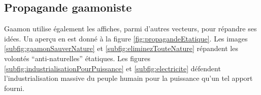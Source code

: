 \subsection{Propagande gaamoniste}
Gaamon utilise également les affiches, parmi d'autres vecteurs, pour répandre ses idées. Un aperçu en est donné à la figure \ref{fig:propagandeEtatique}. Les images \ref{subfig:gaamonSauverNature} et \ref{subfig:eliminezTouteNature} répandent les volontés \enquote{anti-naturelles} étatiques. Les figures \ref{subfig:industrialisationPourPuissance} et \ref{subfig:electricite} défendent l'industrialisation massive du peuple humain pour la puissance qu'un tel apport fourni.

\begin{figure}[ht!]
	\hspace*{.04\linewidth}
	

\end{figure}
